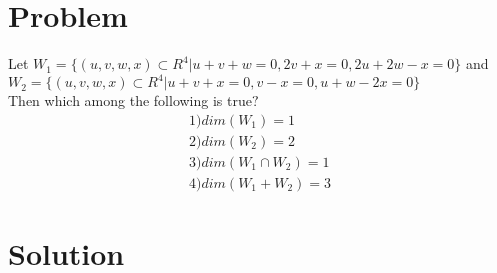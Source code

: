 \section{Problem}
Let $W_{1}=\{(u,v,w,x)\subset R^{4} | u+v+w=0,2v+x=0,2u+2w-x=0\}$ and $W_{2}=\{(u,v,w,x)\subset R^{4} | u+v+x=0,v-x=0,u+w-2x=0\}$\\Then which among the following is true$?$\\
\begin{align}
    1) dim(W_{1})=1
\\
    2) dim(W_{2})=2
\\
    3) dim(W_{1}\cap W_{2})=1
\\
    4) dim(W_{1}+W_{2})=3
\end{align}

\section{Solution}
